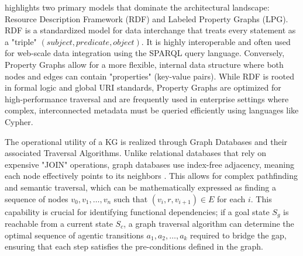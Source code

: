 \citep{kejriwal2021knowledge} highlights two primary models that dominate the architectural landscape: Resource Description Framework (RDF) and Labeled Property Graphs (LPG). 
RDF is a standardized model for data interchange that treats every statement as a "triple" $(subject, predicate, object)$. It is highly interoperable and often used for web-scale data integration using the SPARQL query language. 
Conversely, Property Graphs allow for a more flexible, internal data structure where both nodes and edges can contain "properties" (key-value pairs). While RDF is rooted in formal logic and global URI standards, Property Graphs are optimized for high-performance traversal and are frequently used in enterprise settings where complex, interconnected metadata must be queried efficiently using languages like Cypher.

The operational utility of a KG is realized through Graph Databases and their associated Traversal Algorithms. 
Unlike relational databases that rely on expensive "JOIN" operations, graph databases use index-free adjacency, meaning each node effectively points to its neighbors \citep{stegeman2023native}. 
This allows for complex pathfinding and semantic traversal, which can be mathematically expressed as finding a sequence of nodes $v_0, v_1, \dots, v_n$ such that $(v_i, r, v_{i+1}) \in E$ for each $i$. This capability is crucial for identifying functional dependencies; if a goal state $S_g$ is reachable from a current state $S_c$, a graph traversal algorithm can determine the optimal sequence of agentic transitions $a_1, a_2, \dots, a_k$ required to bridge the gap, ensuring that each step satisfies the pre-conditions defined in the graph.

